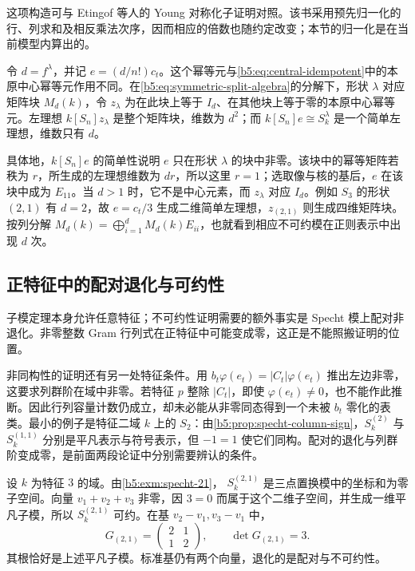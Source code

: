 这项构造可与 Etingof 等人的 Young 对称化子证明对照\cite[Sections 5.12--5.13, pp. 110--113]{EtingofEtAl2011RepresentationTheory}。该书采用预先归一化的行、列求和及相反乘法次序，因而相应的倍数也随约定改变；本节的归一化是在当前模型内算出的。

\ProseParagraphBreak
令 \(d=f^\lambda\)，并记 \(e=(d/n!)c_t\)。这个幂等元与\eqref{b5:eq:central-idempotent}中的本原中心幂等元作用不同。在\eqref{b5:eq:symmetric-split-algebra}的分解下，形状 \(\lambda\) 对应矩阵块 \(M_d(k)\)，令 \(z_\lambda\) 为在此块上等于 \(I_d\)、在其他块上等于零的本原中心幂等元。左理想 \(k[S_n]z_\lambda\) 是整个矩阵块，维数为 \(d^2\)；而 \(k[S_n]e\cong S_k^\lambda\) 是一个简单左理想，维数只有 \(d\)。

\ProseParagraphBreak
具体地，\(k[S_n]e\) 的简单性说明 \(e\) 只在形状 \(\lambda\) 的块中非零。该块中的幂等矩阵若秩为 \(r\)，所生成的左理想维数为 \(dr\)，所以这里 \(r=1\)；选取像与核的基后，\(e\) 在该块中成为 \(E_{11}\)。当 \(d>1\) 时，它不是中心元素，而 \(z_\lambda\) 对应 \(I_d\)。例如 \(S_3\) 的形状 \((2,1)\) 有 \(d=2\)，故 \(e=c_t/3\) 生成二维简单左理想，\(z_{(2,1)}\) 则生成四维矩阵块。按列分解 \(M_d(k)=\bigoplus_{i=1}^dM_d(k)E_{ii}\)，也就看到相应不可约模在正则表示中出现 \(d\) 次。

\subsection{正特征中的配对退化与可约性}
\label{b5:subsec:0604:05}

子模定理本身允许任意特征；不可约性证明需要的额外事实是 Specht 模上配对非退化。非零整数 Gram 行列式在正特征中可能变成零，这正是不能照搬证明的位置。

\ProseParagraphBreak
非同构性的证明还有另一处特征条件。用 \(b_t\varphi(e_t)=|C_t|\varphi(e_t)\) 推出左边非零，这要求列群阶在域中非零。若特征 \(p\) 整除 \(|C_t|\)，即使 \(\varphi(e_t)\ne0\)，也不能作此推断。因此行列容量计数仍成立，却未必能从非零同态得到一个未被 \(b_t\) 零化的表类。最小的例子是特征二域 \(k\) 上的 \(S_2\)：由\cref{b5:prop:specht-column-sign}，\(S_k^{(2)}\) 与 \(S_k^{(1,1)}\) 分别是平凡表示与符号表示，但 \(-1=1\) 使它们同构。配对的退化与列群阶变成零，是前面两段论证中分别需要辨认的条件。

\begin{example}\label{b5:exm:specht-mod-three}
	设 \(k\) 为特征 \(3\) 的域。由\cref{b5:exm:specht-21}， \(S_k^{(2,1)}\) 是三点置换模中的坐标和为零子空间。向量 \(v_1+v_2+v_3\) 非零，因 \(3=0\) 而属于这个二维子空间，并生成一维平凡子模，所以 \(S_k^{(2,1)}\) 可约。在基 \(v_2-v_1,v_3-v_1\) 中，
	\[
		G_{(2,1)}=
		\begin{pmatrix}2&1\\1&2\end{pmatrix},
		\qquad \det G_{(2,1)}=3.
	\]
	其根恰好是上述平凡子模。标准基仍有两个向量，退化的是配对与不可约性。
\end{example}

